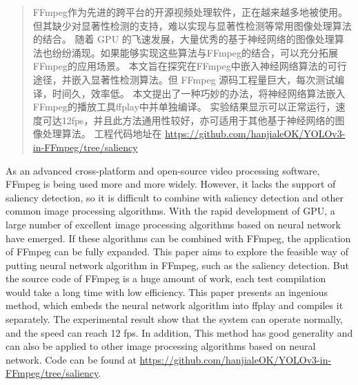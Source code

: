 

\begin{abstract}

FFmpeg作为先进的跨平台的开源视频处理软件，正在越来越多地被使用。但其缺少对显著性检测的支持，难以实现与显著性检测等常用图像处理算法的结合。
随着 GPU 的飞速发展，大量优秀的基于神经网络的图像处理算法也纷纷涌现。如果能够实现这些算法与FFmpeg的结合，可以充分拓展FFmpeg的应用场景。
本文旨在探究在FFmpeg中嵌入神经网络算法的可行途径，并嵌入显著性检测算法。但 FFmpeg 源码工程量巨大，每次测试编译，时间久，效率低。
本文提出了一种巧妙的办法，将神经网络算法嵌入FFmpeg的播放工具ffplay中并单独编译。
实验结果显示可以正常运行，速度可达12fps，并且此方法通用性较好，亦可适用于其他基于神经网络的图像处理算法。
工程代码地址在 \url{https://github.com/hanjialeOK/YOLOv3-in-FFmpeg/tree/saliency}

\end{abstract}

\begin{abstract*}

As an advanced cross-platform and open-source video processing software, FFmpeg is being used more and more widely. 
However, it lacks the support of saliency detection, so it is difficult to combine with saliency detection and other common image processing algorithms. 
With the rapid development of GPU, a large number of excellent image processing algorithms based on neural network have emerged. 
If these algorithms can be combined with FFmpeg, the application of FFmpeg can be fully expanded. 
This paper aims to explore the feasible way of putting neural network algorithm in FFmpeg, such as the saliency detection. 
But the source code of FFmpeg is a huge amount of work, each test compilation would take a long time with low efficiency. 
This paper presents an ingenious method, which embeds the neural network algorithm into ffplay and compiles it separately. 
The experimental result show that the system can operate normally, and the speed can reach 12 fps. 
In addition, This method has good generality and can also be applied to other image processing algorithms based on neural network.
Code can be found at \url{https://github.com/hanjialeOK/YOLOv3-in-FFmpeg/tree/saliency}.

\end{abstract*}